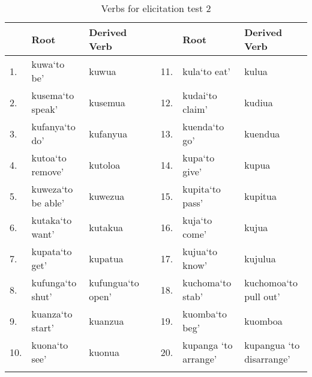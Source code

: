 \documentclass[output=paper]{langsci/langscibook}
\begin{document}
\begin{table}
\begin{tabularx}{\textwidth}{lXXclXp{2.3cm}}
\lsptoprule
 &  Root &  Derived Verb &  &  &  Root &  Derived Verb\\
\midrule
 1. & kuwa\newline  ‘to be’ &  {kuwua} &  &  11. & kula\newline  ‘to eat’ & kulua \\
 2. & kusema\newline  ‘to speak’ &  kusemua &  &  12. & kudai\newline  ‘to claim’ &  kudiua \\
 3. & kufanya\newline  ‘to do’ &  kufanyua &  &  13. & kuenda\newline  ‘to go’ &  kuendua \\
 4. & kutoa\newline  ‘to remove’ &  kutoloa &  &  14. & kupa\newline  ‘to give’ &  kupua\\
 5. & kuweza\newline  ‘to be able’ &  kuwezua &  &  15. & kupita\newline  ‘to pass’ &  kupitua \\
 6. & kutaka\newline  ‘to want’ &  kutakua &  &  16. & kuja\newline  ‘to come’ &  kujua \\
 7. & kupata\newline  ‘to get’ &  kupatua &  &  17. & kujua\newline  ‘to know’ &  kujulua \\
 8. & kufunga\newline  ‘to shut’ & kufungua\newline  ‘to open’ &  &  18. & kuchoma\newline  ‘to stab’ & kuchomoa\newline  ‘to pull out’\\
 9. & kuanza\newline  ‘to start’ &  kuanzua &  &  19. & kuomba\newline  ‘to beg’ &  kuomboa \\
 10. & kuona\newline  ‘to see’ & kuonua &  &  20. &  kupanga \newline  ‘to arrange’ & kupangua
\newline  ‘to disarrange’\\
\lspbottomrule
\end{tabularx}
\caption{Verbs for elicitation test 2}
\label{tab:ngonyaningowa:3}
\end{table}
\end{document}
